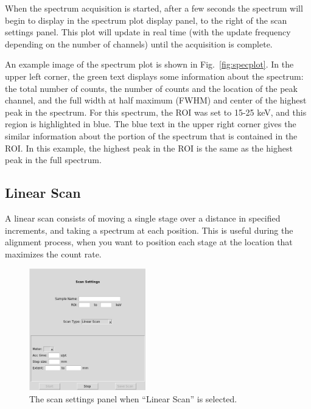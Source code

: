 When the spectrum acquisition is started, after a few seconds the spectrum will
begin to display in the spectrum plot display panel, to the right of the scan
settings panel. This plot will update in real time (with the update frequency
depending on the number of channels) until the acquisition is complete.

An example image of the spectrum plot is shown in Fig.~\ref{fig:specplot}. In
the upper left corner, the green text displays some information about the
spectrum: the total number of counts, the number of counts and the location of
the peak channel, and the full width at half maximum (FWHM) and center of the
highest peak in the spectrum.  For this spectrum, the ROI was set to 15-25 keV,
and this region is highlighted in blue. The blue text in the upper right corner
gives the similar information about the portion of the spectrum that is
contained in the ROI. In this example, the highest peak in the ROI is the same
as the highest peak in the full spectrum.

\subsection{Linear Scan}

A linear scan consists of moving a single stage over a distance in specified
increments, and taking a spectrum at each position. This is useful during the
alignment process, when you want to position each stage at the location that
maximizes the count rate.

\begin{figure}
\centering \includegraphics[width=0.45\textwidth]{linscan.png}
\caption{\label{fig:linscan} The scan settings panel when ``Linear Scan'' is
  selected.}
\end{figure}


